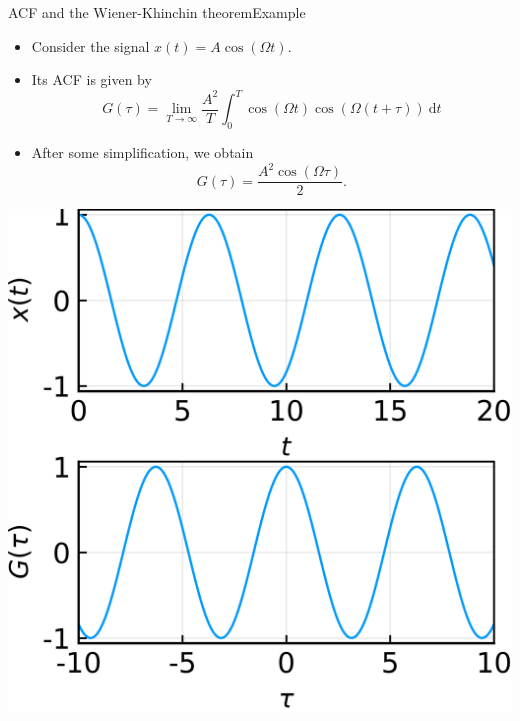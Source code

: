 \documentclass[usenames,dvipsnames,svgnames,10pt,aspectratio=169]{beamer}
\begin{document}
\begin{frame}[t, c]{ACF and the Wiener-Khinchin theorem}{Example}
	\begin{minipage}{.48\textwidth}
		\begin{itemize}
			\item Consider the signal $x(t) = A \cos(\Omega t)$.

			\medskip

			\item Its ACF is given by
			$$
			G(\tau) = \lim_{T \to \infty} \frac{A^2}{T} \int_0^T \cos \left( \Omega t \right) \cos \left( \Omega (t + \tau) \right) \ \mathrm{d}t
			$$

			\item After some simplification, we obtain
			$$
			G(\tau) = \frac{A^2 \cos(\Omega \tau)}{2}.
			$$
		\end{itemize}
	\end{minipage}%
	\hfill
	\begin{minipage}{.48\textwidth}
		\centering
		\includegraphics[width=.75\columnwidth]{cosine_acf}
	\end{minipage}

	\vspace{1cm}
\end{frame}
\end{document}
